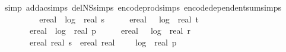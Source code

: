 \begin{isabellebody}
\ {\isacharparenleft}{\kern0pt}simp\ add{\isacharcolon}{\kern0pt}ac{\isacharunderscore}{\kern0pt}simps\ del{\isacharcolon}{\kern0pt}N\isactrlsub S{\isachardot}{\kern0pt}simps\ encode{\isacharunderscore}{\kern0pt}prod{\isachardot}{\kern0pt}simps\ encode{\isacharunderscore}{\kern0pt}dependent{\isacharunderscore}{\kern0pt}sum{\isachardot}{\kern0pt}simps{\isacharparenright}{\kern0pt}\isanewline
\ \ \ \ \isamarkupfalse%
\ \isamarkupfalse%
\ {\isachardoublequoteopen}{\isachardot}{\kern0pt}{\isachardot}{\kern0pt}{\isachardot}{\kern0pt}\ {\isasymle}\ ereal\ {\isacharparenleft}{\kern0pt}{}{\isacharasterisk}{\kern0pt}\ log\ {}\ {\isacharparenleft}{\kern0pt}real\ s\ {\isacharplus}{\kern0pt}\ {}{\isacharparenright}{\kern0pt}\ {\isacharplus}{\kern0pt}\ {}{\isacharparenright}{\kern0pt}\ {\isacharplus}{\kern0pt}\ ereal\ \ {\isacharparenleft}{\kern0pt}{}{\isacharasterisk}{\kern0pt}\ log\ {}\ {\isacharparenleft}{\kern0pt}real\ t\ {\isacharplus}{\kern0pt}\ {}{\isacharparenright}{\kern0pt}\ {\isacharplus}{\kern0pt}\ {}{\isacharparenright}{\kern0pt}\isanewline
\ \ \ \ \ \ {\isacharplus}{\kern0pt}\ ereal\ {\isacharparenleft}{\kern0pt}{}{\isacharasterisk}{\kern0pt}\ log\ {}\ {\isacharparenleft}{\kern0pt}real\ p\ {\isacharplus}{\kern0pt}\ {}{\isacharparenright}{\kern0pt}\ {\isacharplus}{\kern0pt}\ {}{\isacharparenright}{\kern0pt}\ {\isacharplus}{\kern0pt}\ ereal\ {\isacharparenleft}{\kern0pt}{}\ {\isacharasterisk}{\kern0pt}\ log\ {}\ {\isacharparenleft}{\kern0pt}real\ r\ {\isacharplus}{\kern0pt}\ {}{\isacharparenright}{\kern0pt}\ {\isacharplus}{\kern0pt}\ {}{\isacharparenright}{\kern0pt}\isanewline
\ \ \ \ \ \ {\isacharplus}{\kern0pt}\ {\isacharparenleft}{\kern0pt}ereal\ {\isacharparenleft}{\kern0pt}real\ s{\isacharparenright}{\kern0pt}\ {\isacharasterisk}{\kern0pt}\ {\isacharparenleft}{\kern0pt}ereal\ {\isacharparenleft}{\kern0pt}real\ {}\ {\isacharasterisk}{\kern0pt}\ {\isacharparenleft}{\kern0pt}{}\ {\isacharasterisk}{\kern0pt}\ log\ {}\ {\isacharparenleft}{\kern0pt}real\ p{\isacharparenright}{\kern0pt}\ {\isacharplus}{\kern0pt}\ {}{\isacharparenright}{\kern0pt}\ {\isacharplus}{\kern0pt}\ {}{\isacharparenright}{\kern0pt}\ {\isacharplus}{\kern0pt}\ {}{\isacharparenright}{\kern0pt}\ {\isacharplus}{\kern0pt}\ {}{\isacharparenright}{\kern0pt}\ \isanewline

\end{isabellebody}
